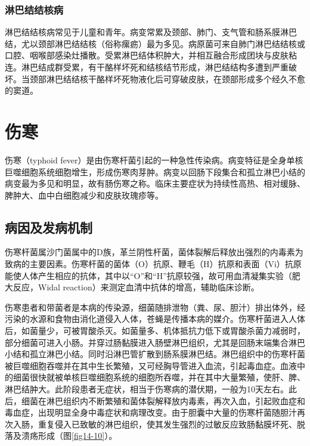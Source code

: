 \subsubsection{淋巴结结核病}

淋巴结结核病常见于儿童和青年。病变常累及颈部、肺门、支气管和肠系膜淋巴结，尤以颈部淋巴结结核（俗称瘰疬）最为多见。病原菌可来自肺门淋巴结结核或口腔、咽喉部感染灶播散。受累淋巴结体积肿大，并相互融合形成团块与皮肤粘连。淋巴结成群受累，有干酪样坏死和结核结节形成，淋巴结结构多遭到严重破坏。当颈部淋巴结结核干酪样坏死物液化后可穿破皮肤，在颈部形成多个经久不愈的窦道。

\section{伤寒}

伤寒（typhoid
fever）是由伤寒杆菌引起的一种急性传染病。病变特征是全身单核巨噬细胞系统细胞增生，形成伤寒肉芽肿。病变以回肠下段集合和孤立淋巴小结的病变最为多见和明显，故有肠伤寒之称。临床主要症状为持续性高热、相对缓脉、脾肿大、血中白细胞减少和皮肤玫瑰疹等。

\subsection{病因及发病机制}

伤寒杆菌属沙门菌属中的D族，革兰阴性杆菌，菌体裂解后释放出强烈的内毒素为致病的主要因素。伤寒杆菌的菌体（O）抗原、鞭毛（H）抗原和表面（Vi）抗原能使人体产生相应的抗体，其中以“O”和“H”抗原较强，故可用血清凝集实验（肥大反应，Widal
reaction）来测定血清中抗体的增高，辅助临床诊断。

伤寒患者和带菌者是本病的传染源，细菌随排泄物（粪、尿、胆汁）排出体外，经污染的水源和食物由消化道侵入人体，苍蝇是传播本病的媒介。伤寒杆菌进入人体后，如菌量少，可被胃酸杀灭。如菌量多、机体抵抗力低下或胃酸杀菌力减弱时，部分细菌可进入小肠。并穿过肠黏膜进入肠壁淋巴组织，尤其是回肠末端集合淋巴小结和孤立淋巴小结。同时沿淋巴管扩散到肠系膜淋巴结。淋巴组织中的伤寒杆菌被巨噬细胞吞噬并在其中生长繁殖，又可经胸导管进入血流，引起毒血症。血液中的细菌很快就被单核巨噬细胞系统的细胞所吞噬，并在其中大量繁殖，使肝、脾、淋巴结肿大。此阶段患者无症状，相当于伤寒病的潜伏期，一般为10天左右。此后，细菌在淋巴组织内不断繁殖和菌体裂解释放内毒素，再次入血，引起败血症和毒血症，出现明显全身中毒症状和病理改变。由于胆囊中大量的伤寒杆菌随胆汁再次入肠，重复侵入已致敏的淋巴组织，使其发生强烈的过敏反应致肠黏膜坏死、脱落及溃疡形成（图\ref{fig14-10}）。


